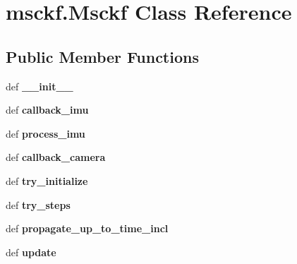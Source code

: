 \hypertarget{classmsckf_1_1_msckf}{\section{msckf.\-Msckf Class Reference}
\label{classmsckf_1_1_msckf}
}
\subsection*{Public Member Functions}
\begin{DoxyCompactItemize}
\item 
\hypertarget{classmsckf_1_1_msckf_acece06247a28c9c6cc17228a7471281e}{def {\bfseries \-\_\-\-\_\-init\-\_\-\-\_\-}}\label{classmsckf_1_1_msckf_acece06247a28c9c6cc17228a7471281e}

\item 
\hypertarget{classmsckf_1_1_msckf_ab718a75ae92fe78165b104903589996b}{def {\bfseries callback\-\_\-imu}}\label{classmsckf_1_1_msckf_ab718a75ae92fe78165b104903589996b}

\item 
\hypertarget{classmsckf_1_1_msckf_ae226b29e88715596bea9912fa5b9eef9}{def {\bfseries process\-\_\-imu}}\label{classmsckf_1_1_msckf_ae226b29e88715596bea9912fa5b9eef9}

\item 
\hypertarget{classmsckf_1_1_msckf_a1489f7f6eb9ac6b0478a186fcd05650f}{def {\bfseries callback\-\_\-camera}}\label{classmsckf_1_1_msckf_a1489f7f6eb9ac6b0478a186fcd05650f}

\item 
\hypertarget{classmsckf_1_1_msckf_abb3ef8cce650ce56470f7f2d23e793c2}{def {\bfseries try\-\_\-initialize}}\label{classmsckf_1_1_msckf_abb3ef8cce650ce56470f7f2d23e793c2}

\item 
\hypertarget{classmsckf_1_1_msckf_ac9935613a6c0603529dc051505c19f63}{def {\bfseries try\-\_\-steps}}\label{classmsckf_1_1_msckf_ac9935613a6c0603529dc051505c19f63}

\item 
\hypertarget{classmsckf_1_1_msckf_a5f8d7a1f9f02faaa3ce4dcf23e7024ff}{def {\bfseries propagate\-\_\-up\-\_\-to\-\_\-time\-\_\-incl}}\label{classmsckf_1_1_msckf_a5f8d7a1f9f02faaa3ce4dcf23e7024ff}

\item 
\hypertarget{classmsckf_1_1_msckf_a2a9394d1a3c7220d2804cbb6ca103b4f}{def {\bfseries update}}\label{classmsckf_1_1_msckf_a2a9394d1a3c7220d2804cbb6ca103b4f}


\end{DoxyCompactItemize}
